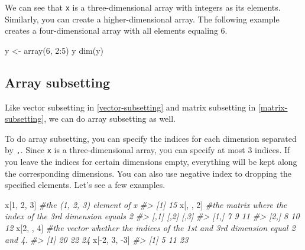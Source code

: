 \documentclass[
]{book}
\newenvironment{Shaded}{\begin{snugshade}}{\end{snugshade}}
\newcommand{\CommentTok}[1]{\textcolor[rgb]{0.56,0.35,0.01}{\textit{#1}}}
\newcommand{\DecValTok}[1]{\textcolor[rgb]{0.00,0.00,0.81}{#1}}
\newcommand{\FunctionTok}[1]{\textcolor[rgb]{0.00,0.00,0.00}{#1}}
\newcommand{\NormalTok}[1]{#1}
\newcommand{\OtherTok}[1]{\textcolor[rgb]{0.56,0.35,0.01}{#1}}
\newcommand{\SpecialCharTok}[1]{\textcolor[rgb]{0.00,0.00,0.00}{#1}}
\begin{document}
We can see that \texttt{x} is a three-dimensional array with integers as its elements. Similarly, you can create a higher-dimensional array. The following example creates a four-dimensional array with all elements equaling 6.

\begin{Shaded}
\begin{Highlighting}[]
\NormalTok{y }\OtherTok{\textless{}{-}} \FunctionTok{array}\NormalTok{(}\DecValTok{6}\NormalTok{, }\DecValTok{2}\SpecialCharTok{:}\DecValTok{5}\NormalTok{)}
\NormalTok{y}
\FunctionTok{dim}\NormalTok{(y)}
\end{Highlighting}
\end{Shaded}

\hypertarget{array-subsetting}{%
\subsection{Array subsetting}\label{array-subsetting}}

Like vector subsetting in \ref{vector-subsetting} and matrix subsetting in \ref{matrix-subsetting}, we can do array subsetting as well.

To do array subsetting, you can specify the indices for each dimension separated by \texttt{,}. Since \texttt{x} is a three-dimensional array, you can specify at most 3 indices. If you leave the indices for certain dimensions empty, everything will be kept along the corresponding dimensions. You can also use negative index to dropping the specified elements. Let's see a few examples.

\begin{Shaded}
\begin{Highlighting}[]
\NormalTok{x[}\DecValTok{1}\NormalTok{, }\DecValTok{2}\NormalTok{, }\DecValTok{3}\NormalTok{]     }\CommentTok{\#the (1, 2, 3) element of x}
\CommentTok{\#\textgreater{} [1] 15}
\NormalTok{x[, , }\DecValTok{2}\NormalTok{]       }\CommentTok{\#the matrix where the index of the 3rd dimension equals 2}
\CommentTok{\#\textgreater{}      [,1] [,2] [,3]}
\CommentTok{\#\textgreater{} [1,]    7    9   11}
\CommentTok{\#\textgreater{} [2,]    8   10   12}
\NormalTok{x[}\DecValTok{2}\NormalTok{, , }\DecValTok{4}\NormalTok{]      }\CommentTok{\#the vector whether the indices of the 1st and 3rd dimension equal 2 and 4.}
\CommentTok{\#\textgreater{} [1] 20 22 24}
\NormalTok{x[}\SpecialCharTok{{-}}\DecValTok{2}\NormalTok{, }\DecValTok{3}\NormalTok{, }\SpecialCharTok{{-}}\DecValTok{3}\NormalTok{]   }
\CommentTok{\#\textgreater{} [1]  5 11 23}
\end{Highlighting}
\end{Shaded}
\end{document}
